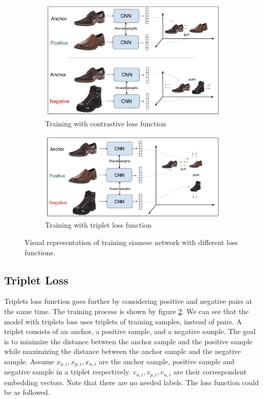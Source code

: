 \begin{figure}[h]
  \centering
  \begin{subfigure}[b]{\linewidth}
  \includegraphics[width=\linewidth]{figs/contrastive.png}
  \caption{Training with contrastive loss function}
  \label{fig:contrastive}
  \end{subfigure}
  \hfill
    \begin{subfigure}[b]{\linewidth}
   \includegraphics[width=\linewidth]{figs/triplet.png}
   \caption{Training with triplet loss function}
   \label{fig:triplet}
  \end{subfigure}
  \hfill
    \caption{Visual representation of training siamese network with different loss functions.}
    \label{fig:sialoss}
\end{figure}

\subsection{Triplet Loss}

Triplets loss function goes further by considering positive and negative pairs at the same time. The training process is shown by figure \ref{fig:triplet}. We can see that the model with triplets loss uses triplets of training samples, instead of pairs. A triplet consists of an anchor, a positive sample, and a negative sample. The goal is to minimize the distance between the anchor sample and the positive sample while maximizing the distance between the anchor sample and the negative sample. Assume $x_{a,i}, x_{p,i}, x_{n,i}$ are the anchor sample, positive sample and negative sample in a triplet respectively. $v_{a,i}, v_{p,i}, v_{n,i}$ are their correspondent embedding vectors. Note that there are no needed labels. The loss function could be as followed. 

